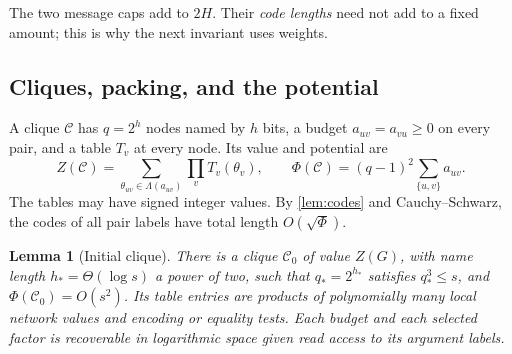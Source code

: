 \documentclass[11pt]{article}
\newtheorem{lemma}[theorem]{Lemma}
\theoremstyle{definition}
\theoremstyle{remark}
\begin{document}
The two message caps add to $2H$. Their \emph{code lengths} need not add to a fixed amount; this is why the next invariant uses weights.

\subsection{Cliques, packing, and the potential}\label{sec:cliques}

A clique $\mathcal C$ has $q=2^h$ nodes named by $h$ bits, a budget $a_{uv}=a_{vu}\ge0$ on every pair, and a table $T_v$ at every node. Its value and potential are
\[
 Z(\mathcal C)=\sum_{\theta_{uv}\in\Lambda(a_{uv})}\prod_v T_v(\theta_v),
 \qquad
 \Phi(\mathcal C)=(q-1)^2\sum_{\{u,v\}}a_{uv}.
\]
The tables may have signed integer values. By \cref{lem:codes} and Cauchy--Schwarz, the codes of all pair labels have total length $O(\sqrt\Phi)$.

\begin{lemma}[Initial clique]\label{lem:initial}
There is a clique $\mathcal C_0$ of value $Z(G)$, with name length $h_*=\Theta(\log s)$ a power of two, such that $q_*=2^{h_*}$ satisfies $q_*^3\le s$, and $\Phi(\mathcal C_0)=O(s^2)$. Its table entries are products of polynomially many local network values and encoding or equality tests. Each budget and each selected factor is recoverable in logarithmic space given read access to its argument labels.
\end{lemma}
\end{document}
